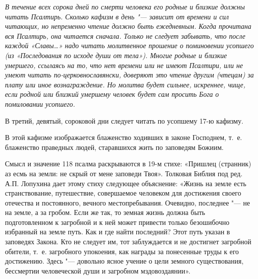 \begin{mymulticols}
 


{\itshape В течение всех сорока дней по смерти человека его родные и близкие должны читать Псалтирь. Сколько кафизм в день "--- зависит от времени и сил читающих, но непременно чтение должно быть ежедневным. Когда прочитана вся Псалтирь, она читается сначала. Только не следует забывать, что после каждой «Славы…» надо читать молитвенное прошение о поминовении усопшего (из «Последования по исходе души от тела»). Многие родные и близкие умершего, ссылаясь на то, что нет времени или не имеют Псалтири, или не умеют читать по-церковнославянски, доверяют это чтение другим (чтецам) за плату или иное вознаграждение. Но молитва будет сильнее, искреннее, чище, если родной или близкий умершему человек будет сам просить Бога о помиловании усопшего. 

В третий, девятый, сороковой дни следует читать по усопшему 17-ю кафизму. 

В этой кафизме изображается блаженство ходивших в законе Господнем, т.~е. блаженство праведных людей, старавшихся жить по заповедям Божиим. 

Смысл и значение 118 псалма раскрываются в 19-м стихе: «Пришлец (странник) аз есмь на земли: не скрый от мене заповеди Твоя». Толковая Библия под ред. А.П. Лопухина дает этому стиху следующее объяснение: «Жизнь на земле есть странствование, путешествие, совершаемое человеком для достижения своего отечества и постоянного, вечного местопребывания. Очевидно, последнее "--- не на земле, а за гробом. Если же так, то земная жизнь должна быть подготовленном к загробной и к ней может привести только безошибочно избранный на земле путь. Как и где найти последний? Этот путь указан в заповедях Закона. Кто не следует им, тот заблуждается и не достигнет загробной обители, т.~е. загробного упокоения, как награды за понесенные труды к его достижению. Здесь "--- довольно ясное учение о цели земного существования, бессмертии человеческой души и загробном мздовоздаянии». 

} 

\end{mymulticols}

\mychapterending


